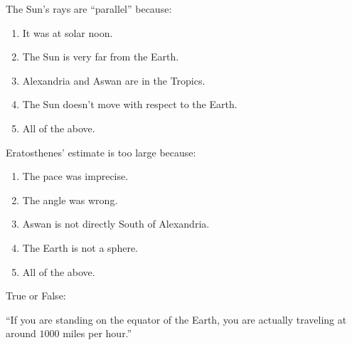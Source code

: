 \documentclass[noauthor,nooutcomes]{ximera}
\author{Bart Snapp and Claire Merriman}
\begin{document}
\maketitle


\begin{exercise}
  The Sun's rays are ``parallel'' because:
  \begin{enumerate}
  \item It was at solar noon.
  \item The Sun is very far from the Earth.
  \item Alexandria and Aswan are in the Tropics.
  \item The Sun doesn't move with respect to the Earth.
  \item All of the above.
  \end{enumerate}
\end{exercise}

\begin{exercise}
  Eratosthenes' estimate is too large because:
  \begin{enumerate}
  \item The pace was imprecise.
  \item The angle was wrong.
  \item Aswan is not directly South of Alexandria. 
  \item The Earth is not a sphere.
  \item All of the above.
  \end{enumerate}
\end{exercise}




\begin{exercise}
  True or False:

  
  ``If you are standing on the equator of the Earth, you are actually traveling at around $1000$ miles per hour.''
\end{exercise}
\end{document}
